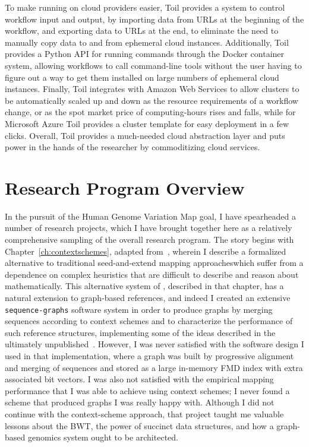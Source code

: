 To make running on cloud providers easier, Toil provides a system to control workflow input and output, by importing data from URLs at the beginning of the workflow, and exporting data to URLs at the end, to eliminate the need to manually copy data to and from ephemeral cloud instances. Additionally, Toil provides a Python API for running commands through the Docker container system, allowing workflows to call command-line tools without the user having to figure out a way to get them installed on large numbers of ephemeral cloud instances. Finally, Toil integrates with Amazon Web Services to allow clusters to be automatically scaled up and down as the resource requirements of a workflow change, or as the spot market price of computing-hours rises and falls, while for Microsoft Azure Toil provides a cluster template for easy deployment in a few clicks. Overall, Toil provides a much-needed cloud abstraction layer and puts power in the hands of the researcher by commoditizing cloud services.

\section{Research Program Overview}


In the pursuit of the Human Genome Variation Map goal, I have spearheaded a number of research projects, which I have brought together here as a relatively comprehensive sampling of the overall research program. The story begins with Chapter~\ref{ch:contextschemes}, adapted from~\citet{novak2015canonical}, wherein I describe a formalized alternative to traditional seed-and-extend mapping approacheswhich suffer from a dependence on complex heuristics that are difficult to describe and reason about mathematically. This alternative system of , described in that chapter, has a natural extension to graph-based references, and indeed I created an extensive \texttt{sequence-graphs} software system in order to produce graphs by merging sequences according to context schemes and to characterize the performance of such reference structures, implementing some of the ideas described in the ultimately unpublished~\citet{paten2014mapping}. However, I was never satisfied with the software design I used in that implementation, where a graph was built by progressive alignment and merging of sequences and stored as a large in-memory FMD index with extra associated bit vectors. I was also not satisfied with the empirical mapping performance that I was able to achieve using context schemes; I never found a scheme that produced graphs I was really happy with. Although I did not continue with the context-scheme approach, that project taught me valuable lessons about the BWT, the power of succinct data structures, and how a graph-based genomics system ought to be architected.


